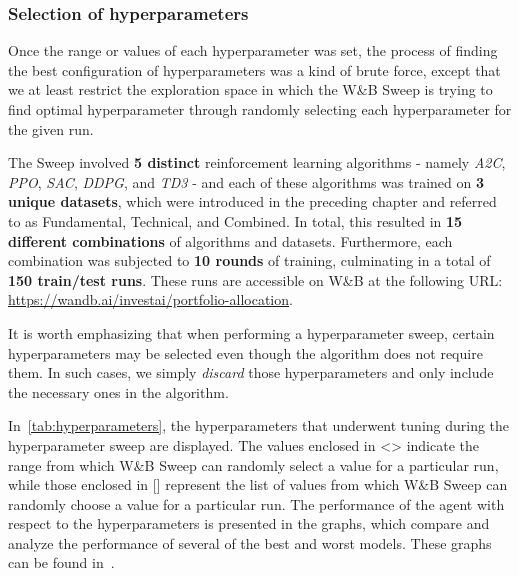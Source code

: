 \documentclass[../xlapes02]{subfiles}
\begin{document}
    \subsubsection{Selection of hyperparameters}\label{subsubsec:selection_of_hyperparameters}
    Once the range or values of each hyperparameter was set, the process of finding the best configuration of hyperparameters was a kind of brute force, except that we at least restrict the exploration space in which the W\&B Sweep is trying to find optimal hyperparameter through randomly selecting each hyperparameter for the given run.

    The Sweep involved \textbf{5 distinct} reinforcement learning algorithms - namely \emph{A2C}, \emph{PPO}, \emph{SAC}, \emph{DDPG}, and \emph{TD3} - and each of these algorithms was trained on \textbf{3 unique datasets}, which were introduced in the preceding chapter and referred to as Fundamental, Technical, and Combined. In total, this resulted in \textbf{15 different combinations} of algorithms and datasets. Furthermore, each combination was subjected to \textbf{10 rounds} of training, culminating in a total of \textbf{150 train/test runs}. These runs are accessible on W\&B at the following URL: \url{https://wandb.ai/investai/portfolio-allocation}.

    It is worth emphasizing that when performing a hyperparameter sweep, certain hyperparameters may be selected even though the algorithm does not require them. In such cases, we simply \emph{discard} those hyperparameters and only include the necessary ones in the algorithm.

    In~\cref{tab:hyperparameters}, the hyperparameters that underwent tuning during the hyperparameter sweep are displayed. The values enclosed in <> indicate the range from which W\&B Sweep can randomly select a value for a particular run, while those enclosed in [] represent the list of values from which W\&B Sweep can randomly choose a value for a particular run. The performance of the agent with respect to the hyperparameters is presented in the graphs, which compare and analyze the performance of several of the best and worst models. These graphs can be found in~.
\end{document}
